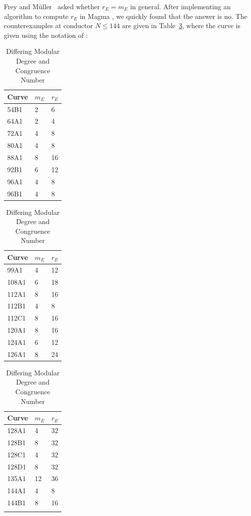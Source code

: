 \documentclass[10pt,twoside]{article}
\newcommand{\re}{r_{\scriptscriptstyle E}}
\newcommand{\me}{m_{\scriptscriptstyle E}}
\theoremstyle{definition}
\begin{document}
Frey and M{\"u}ller~\cite[Ques.~4.4]{frey-muller} asked whether $\re =
\me$ in general.  After implementing an algorithm to compute $\re$ in
Magma \cite{magma}, we quickly found that the answer is no. The
counterexamples at conductor $N\leq 144$ are given in Table~\ref{table:moddeg}, 
where the curve
is given using the notation of \cite{cremona:alg}:
\begin{table}\caption{Differing Modular Degree and 
Congruence Number\label{table:moddeg}}
\begin{center}
\begin{tabular}{|l|l|l|}\hline
Curve & $\me$ & $\re$\\\hline
54B1 & 2 & 6\\\hline
64A1 & 2 & 4 \\\hline
72A1 & 4 & 8 \\\hline
80A1 & 4 & 8 \\\hline
88A1 & 8 & 16 \\\hline
92B1 & 6 & 12\\\hline
96A1 & 4 & 8 \\\hline
96B1 & 4 & 8 \\\hline
\end{tabular}
\begin{tabular}{|l|l|l|}\hline
Curve & $\me$ & $\re$\\\hline
99A1 & 4 & 12\\\hline
108A1 & 6 & 18\\\hline
112A1 & 8 & 16\\\hline
112B1 & 4 & 8\\\hline
112C1 & 8 & 16\\\hline
120A1 & 8 & 16\\\hline
124A1 & 6 & 12\\\hline
126A1 & 8 & 24\\\hline
\end{tabular}
\begin{tabular}{|l|l|l|}\hline
Curve & $\me$ & $\re$\\\hline
128A1 & 4 & 32\\\hline
128B1 & 8 & 32\\\hline
128C1 & 4 & 32\\\hline
128D1 & 8 & 32\\\hline
135A1 & 12 & 36\\\hline
144A1 & 4 & 8 \\\hline
144B1 & 8 & 16 \\\hline
&&\\\hline
\end{tabular}
\end{center}
\end{table}
\end{document}
